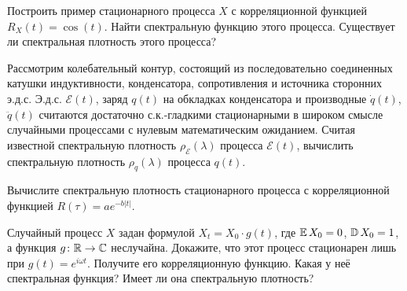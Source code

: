 \documentclass[12pt]{article}
\def\canon{\textbf{(каноническое задание)}}
\begin{document}
\begin{exercise}[subtitle={\canon}]
    Построить пример стационарного процесса $ X $ с корреляционной функцией $ R_X(t) = \cos(t) $.
    Найти спектральную функцию этого процесса.
    Существует ли спектральная плотность этого процесса?
\end{exercise}


\begin{exercise}[subtitle={\canon}]
    Рассмотрим колебательный контур,
    состоящий из последовательно соединенных катушки индуктивности,
    конденсатора, сопротивления и источника сторонних э.д.с.
    Э.д.с. $ \mathcal{E}(t) $, заряд $ q(t) $ на обкладках конденсатора и производные $ \dot q(t) $, $ \ddot q(t) $
    считаются достаточно с.к.-гладкими стационарными в широком смысле случайными процессами с нулевым математическим ожиданием.
    Считая известной спектральную плотность $ \rho_{\mathcal{E}}(\lambda) $ процесса $ \mathcal{E}(t) $,
    вычислить спектральную плотность $ \rho_q(\lambda) $ процесса $ q(t) $.
\end{exercise}


\begin{exercise}
    Вычислите спектральную плотность стационарного процесса с корреляционной функцией $ R(\tau) = a e^{-b|t|} $.
\end{exercise}


\begin{exercise}
    Случайный процесс $ X $ задан формулой $ X_t = X_0 \cdot g(t) $,
    где $ \operatorname{\mathbb{E}} X_0 = 0 $, $ \operatorname{\mathbb{D}} X_0 = 1 $, а функция $ g \colon \mathbb{R} \to \mathbb{C} $ неслучайна.
    Докажите, что этот процесс стационарен лишь при $ g(t) = e^{i \omega t} $.
    Получите его корреляционную функцию.
    Какая у неё спектральная функция?
    Имеет ли она спектральную плотность?
\end{exercise}
\end{document}
